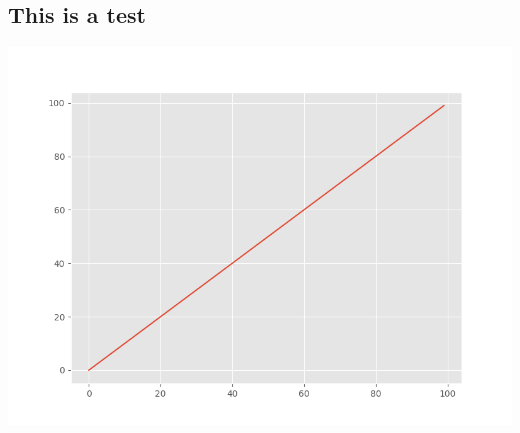 \subsection{This is a test}\label{this-is-a-test}

\begin{Shaded}
\begin{Highlighting}[]
\OperatorTok{=}\NormalTok{,}\NormalTok{,}\NormalTok{)}
\end{Highlighting}
\end{Shaded}

\includegraphics{figures/paper-starter-kit_myplot_1.png}\\
